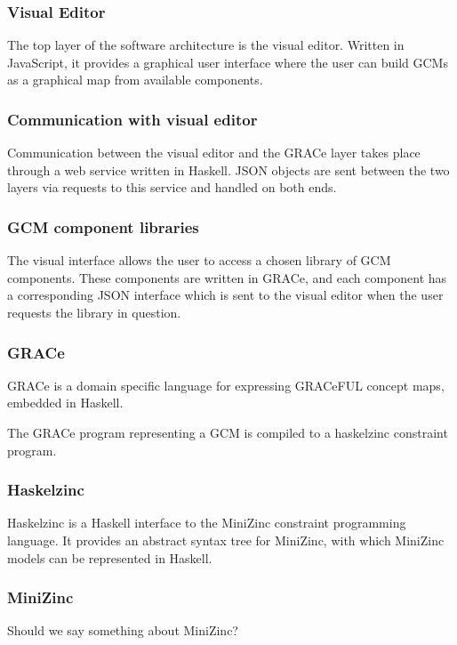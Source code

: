 \subsubsection{Visual Editor}
The top layer of the software architecture is the visual editor. Written in
JavaScript, it provides a graphical user interface where the user can build
GCMs as a graphical map from available components.

\subsubsection{Communication with visual editor}
Communication between the visual editor and the GRACe layer takes place through
a web service written in Haskell. JSON objects are sent between the two layers
via requests to this service and handled on both ends.  

\subsubsection{GCM component libraries}
The visual interface allows the user to access a chosen library of GCM
components. These components are written in GRACe, and each component has
a corresponding JSON interface which is sent to the visual editor when the
user requests the library in question.

\subsubsection{GRACe}
GRACe is a domain specific language for expressing GRACeFUL concept maps,
embedded in Haskell.

The GRACe program representing a GCM is compiled to a haskelzinc constraint
program.

\subsubsection{Haskelzinc}
Haskelzinc is a Haskell interface to the MiniZinc constraint programming language.
It provides an abstract syntax tree for MiniZinc, with which MiniZinc models can
be represented in Haskell.

\subsubsection{MiniZinc}
Should we say something about MiniZinc?
